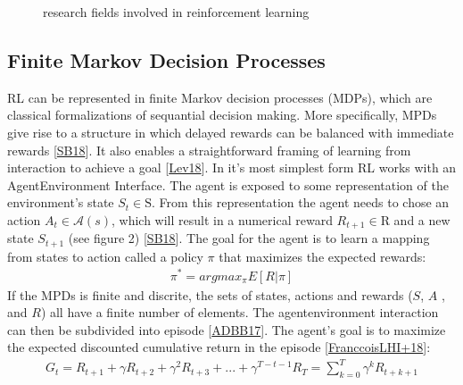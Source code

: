 \documentclass[letterpaper,10pt,english]{jupyterBook}
\let\sphinxpxdimen\pdfpxdimen\else\newdimen\sphinxpxdimen
\begin{document}
\begin{figure}[htbp]
\centering
\capstart

\noindent\sphinxincludegraphics[width=600\sphinxpxdimen,height=250\sphinxpxdimen]{{tree}.png}
\caption{research fields involved in reinforcement learning}\label{\detokenize{Reinforcement_learning:tree-fig}}\end{figure}


\subsection{Finite Markov Decision Processes}
\label{\detokenize{Reinforcement_learning:finite-markov-decision-processes}}
\sphinxAtStartPar
RL can be represented in finite Markov decision processes (MDPs), which are classical formalizations of sequantial decision making. More specifically, MPDs give rise to a structure in which delayed rewards can be balanced with immediate rewards {[}\hyperlink{cite.Financial_application:id55}{SB18}{]}. It also enables a straightforward framing of learning from interaction to achieve a goal {[}\hyperlink{cite.Financial_application:id49}{Lev18}{]}. In it’s most simplest form RL works with an Agent\sphinxhyphen{}Environment Interface. The agent is exposed to some representation of the environment’s state \(S_t \in \mathrm{S}\). From this representation the agent needs to chose an action \( A_t \in \mathcal{A}(s)\), which will result in a numerical reward \(R_{t+1} \in \mathrm{R} \) and a new state \(S_{t+1}\) (see figure 2) {[}\hyperlink{cite.Financial_application:id55}{SB18}{]}. The goal for the agent is to learn a mapping from states to action called a policy \(\pi\) that maximizes the expected rewards:
\begin{equation*}
\begin{split} \pi^* = argmax_{\pi} E[R|\pi] \end{split}
\end{equation*}
\sphinxAtStartPar
If the MPDs is finite and discrite, the sets of states, actions and rewards (\(S\), \(A\) , and \(R\)) all have a finite number of elements. The agent\sphinxhyphen{}environment interaction can then be subdivided into episode {[}\hyperlink{cite.Financial_application:id51}{ADBB17}{]}.  The agent’s goal is to maximize the expected discounted cumulative return in the episode {[}\hyperlink{cite.Financial_application:id56}{FranccoisLHI+18}{]}:
\begin{equation*}
\begin{split} G_t = R_{t+1} + \gamma R_{t+2} + \gamma^2 R_{t+3} + ... + \gamma^{T-t-1}R_T = \sum_{k=0}^T \gamma^k R_{t+k+1}\end{split}
\end{equation*}
\end{document}
